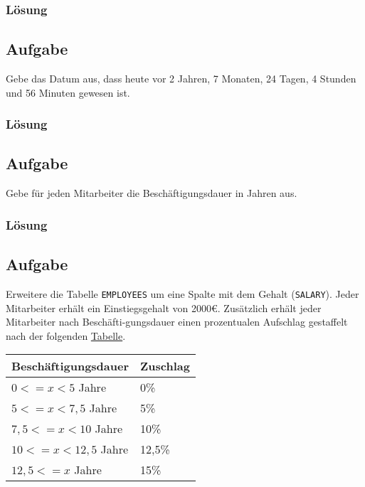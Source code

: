 \subsubsection*{Lösung}
\label{sec:uebung_03.aufgabe_09.loesung}

\subsection{Aufgabe}
\label{sec:uebung_03.aufgabe_10}
Gebe das Datum aus, dass heute vor 2 Jahren, 7 Monaten, 24 Tagen, 4 Stunden und 56 Minuten gewesen ist.

\subsubsection*{Lösung}
\label{sec:uebung_03.aufgabe_10.loesung}

\subsection{Aufgabe}
\label{sec:uebung_03.aufgabe_11}
Gebe für jeden Mitarbeiter die Beschäftigungsdauer in Jahren aus.

\subsubsection*{Lösung}
\label{sec:uebung_03.aufgabe_11.loesung}

\subsection{Aufgabe}
\label{sec:uebung_03.aufgabe_12}
Erweitere die Tabelle \texttt{EMPLOYEES} um eine Spalte mit dem Gehalt (\texttt{SALARY}). Jeder Mitarbeiter erhält ein Einstiegsgehalt von 2000\euro{}. Zusätzlich erhält jeder Mitarbeiter nach Beschäfti-gungsdauer einen prozentualen Aufschlag gestaffelt nach der folgenden \hyperref[tbl:uebung_03.aufgabe_12]{Tabelle}.

\begin{table}[H]
  \ttfamily
  \centering
  \begin{tabular}{l|l}
    \textbf{Beschäftigungsdauer} & \textbf{Zuschlag} \\
    \hline\hline
    $0<=x<5$ Jahre & 0\% \\
    $5<=x<7,5$ Jahre & 5\% \\
    $7,5<=x<10$ Jahre & 10\% \\
    $10<=x<12,5$ Jahre & 12,5\% \\
    $12,5<=x$ Jahre & 15\% \\
  \end{tabular}
  \label{tbl:uebung_03.aufgabe_12}
\end{table}


